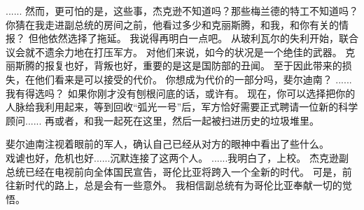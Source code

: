 \documentclass[openany]{book}
\begin{document}
\begin{dialogue}
     ......
     然而，更可怕的是，这些事，杰克逊不知道吗？那些梅兰德的特工不知道吗？
     你猜在我走进副总统的房间之前，他看过多少和克丽斯腾，和我，和你有关的情报？
     但他依然选择了拖延。
     我说得再明白一点吧。
     从玻利瓦尔的失利开始，联合议会就不遗余力地在打压军方。
     对他们来说，如今的状况是一个绝佳的武器。
     克丽斯腾的报复也好，背叛也好，重要的是这是国防部的丑闻。
     至于因此带来的损失，在他们看来是可以接受的代价。
     你想成为代价的一部分吗，斐尔迪南？
     ......我有得选吗？
     如果你刚才没有刨根问底的话，或许有。
     现在，你可以选择把你的人脉给我利用起来，等到回收“弧光一号”后，军方恰好需要正式聘请一位新的科学顾问......
     再或者，和我一起死在这里，然后一起被扫进历史的垃圾堆里。\par
    斐尔迪南注视着眼前的军人，确认自己已经从对方的眼神中看出了些什么。\\
    戏谑也好，危机也好......沉默连接了这两个人。
     ......我明白了，上校。
     杰克逊副总统已经在电视前向全体国民宣告，哥伦比亚将跨入一个全新的时代。
     可是，前往新时代的路上，总是会有一些意外。
     我相信副总统有为哥伦比亚奉献一切的觉悟。
\end{dialogue}
\end{document}

